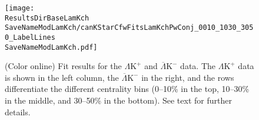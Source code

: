 \documentclass[ALICE,manyauthors]{cernphprep}
\newcommand{\ResultsDirBaseLamKch}{/home/jesse/Analysis/FemtoAnalysis/Results/Results_cLamcKch_20180505/}
\newcommand{\ResultsDirBaseLamKs}{/home/jesse/Analysis/FemtoAnalysis/Results/Results_cLamK0_20180505/}
\newcommand{\MomRes}{_MomResCrctn}%
\newcommand{\NonFlatBgdLamKch}{_NonFlatBgdCrctnLamK0LamKchPolynomial}
\newcommand{\NonFlatBgdLamKs}{_NonFlatBgdCrctnLamK0LamKchPolynomial}
\newcommand{\ResNum}{_3Res}
\newcommand{\PrimMaxDecay}{_PrimMaxDecay10fm}
\newcommand{\ResMethod}{_UsingXiDataAndCoulombOnly}
\newcommand{\ParamFixAndShareLamKch}{_ShareLam_Dualie_ShareLam_ShareRadii}
\newcommand{\ParamFixAndShareLamKs}{_ShareLam_Dualie_ShareLam_ShareRadii}
\newcommand{\SaveNameModLamKch}{\MomRes\NonFlatBgdLamKch\ResNum\PrimMaxDecay\ResMethod\ParamFixAndShareLamKch}
\newcommand{\SaveNameModLamKs}{\MomRes\NonFlatBgdLamKs\ResNum\PrimMaxDecay\ResMethod\ParamFixAndShareLamKs}
\newcommand{\LamK}{$\Lambda$K\xspace}
\newcommand{\LamKchP}{$\Lambda\mathrm{K^{+}}$\xspace}
\newcommand{\ALamKchM}{$\overline{\Lambda}\mathrm{K^{-}}$\xspace}
\newcommand{\LamKchPALamKchM}{$\Lambda\mathrm{K^{+}}$ ($\overline{\Lambda}\mathrm{K^{-}}$)\xspace}
\newcommand{\LamKchMALamKchP}{$\Lambda\mathrm{K^{-}}$ ($\overline{\Lambda}\mathrm{K^{+}}$)\xspace}
\newcommand{\LamKsALamKs}{$\Lambda\mathrm{K^{0}_{S}}$ ($\overline{\Lambda}\mathrm{K^{0}_{S}}$)\xspace}
\begin{document}
\begin{comment}
\begin{figure}[htp]
  \centering
  \subfigure[\LamKchPALamKchM]{
    \label{fig:LamKFits_3Res:a}
    \texttt{[image: \\ResultsDirBaseLamKch\\SaveNameModLamKch/canKStarCfwFitsLamKchPwConj\_0010\_1030\_3050\_LabelLines\\SaveNameModLamKch.pdf]}}
  \subfigure[\LamKchMALamKchP]{
    \label{fig:LamKFits_3Res:b}
    \texttt{[image: \\ResultsDirBaseLamKch\\SaveNameModLamKch/canKStarCfwFitsLamKchMwConj\_0010\_1030\_3050\_LabelLines\\SaveNameModLamKch.pdf]}}
  \\  
  \subfigure[\LamKsALamKs]{
    \label{fig:LamKFits_3Res:c}
    \texttt{[image: \\ResultsDirBaseLamKs\\SaveNameModLamKs/canKStarCfwFitsLamK0wConj\_0010\_1030\_3050\_LabelLines\\SaveNameModLamKs.pdf]}}    
  \caption{Fits, with 3 residual correlations included, for all \LamK analyses across all studied centralities (0--10\%, 10--30\%, and 30--50\%).
 The lines represent the statistical errors, while the boxes represent the systematic errors.
 The black solid line represents the primary (\LamK) correlation's contribution to the fit.  
 The green line shows the fit to the non-flat background.
 The purple points show the fit after all residuals' contributions have been included, and momentum resolution and non-flat background corrections have been applied.
 The extracted fit values with uncertainties are printed.}  
  \label{fig:LamKFits_3Res}
\end{figure}
\end{comment}

\begin{figure}[h]
  \centering
  \texttt{[image: \\ResultsDirBaseLamKch\\SaveNameModLamKch/canKStarCfwFitsLamKchPwConj\_0010\_1030\_3050\_LabelLines\\SaveNameModLamKch.pdf]}
  \caption[\LamKchPALamKchM data with fits]
  {
  (Color online) Fit results for the \LamKchP and \ALamKchM data.
  The \LamKchP data is shown in the left column, the \ALamKchM in the right, and the rows differentiate the different centrality bins (0--10\% in the top, 10--30\% in the middle, and 30--50\% in the bottom).
  See text for further details.
  }
  \label{fig:LamKchPwConjFits_3Res}
\end{figure}
\end{document}

